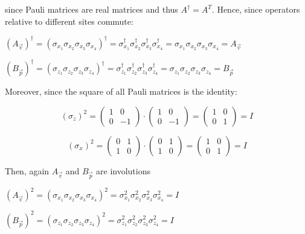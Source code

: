 \documentclass{Configuration_Files/PoliMi3i_thesis}
\begin{document}
since Pauli matrices are real matrices and thus $A^{\dagger}=A^T$.
Hence, since operators relative to different sites commute:

\begin{center}
	$(A_{\vec{v}})^{\dagger} = (\sigma_{x_1} \sigma_{x_2} \sigma_{x_3} \sigma_{x_4})^{\dagger} = \sigma_{x_1}^{\dagger} \sigma_{x_2}^{\dagger} \sigma_{x_3}^{\dagger} \sigma_{x_4}^{\dagger} = \sigma_{x_1} \sigma_{x_2} \sigma_{x_3} \sigma_{x_4} = A_{\vec{v}}$ \newline
	
	$(B_{\vec{p}})^{\dagger} = (\sigma_{z_1} \sigma_{z_2} \sigma_{z_3} \sigma_{z_4})^{\dagger} = \sigma_{z_1}^{\dagger} \sigma_{z_2}^{\dagger} \sigma_{z_3}^{\dagger} \sigma_{z_4}^{\dagger} = \sigma_{z_1} \sigma_{z_2} \sigma_{z_3} \sigma_{z_4} = B_{\vec{p}}$ \newline
\end{center}

Moreover, since the square of all Pauli matrices is the identity:\newline

\[
\text{$( \sigma_z )^{2}$} = 
\begin{pmatrix}
	1 & 0 \\
	0 & -1
\end{pmatrix} \cdot
\begin{pmatrix}
	1 & 0 \\
	0 & -1
\end{pmatrix} =
\begin{pmatrix}
	1 & 0 \\
	0 & 1
\end{pmatrix}
= \text{$I$}
\]


\[
\text{$( \sigma_x )^{2}$} = 
\begin{pmatrix}
	0 & 1 \\
	1 & 0
\end{pmatrix} \cdot
\begin{pmatrix}
	0 & 1 \\
	1 & 0
\end{pmatrix} =
\begin{pmatrix}
	1 & 0 \\
	0 & 1
\end{pmatrix}
= \text{$I$}
\]\newline


Then, again $A_{\vec{v}}$ and $B_{\vec{p}}$ are involutions \newline

\begin{center}
	$(A_{\vec{v}})^{2} = (\sigma_{x_1} \sigma_{x_2} \sigma_{x_3} \sigma_{x_4})^{2} = \sigma_{x_1}^2 \sigma_{x_2}^2 \sigma_{x_3}^2 \sigma_{x_4}^2 = I$ 
	
	$(B_{\vec{p}})^{2} = (\sigma_{z_1} \sigma_{z_2} \sigma_{z_3} \sigma_{z_4})^{2} = \sigma_{z_1}^2 \sigma_{z_2}^2 \sigma_{z_3}^2 \sigma_{z_4}^2 = I$
\end{center}
\end{document}
